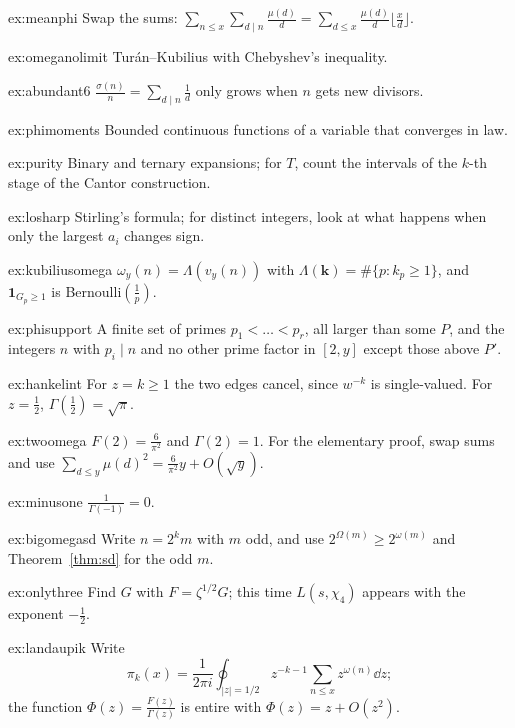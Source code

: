 \begin{hint}{ex:meanphi}
Swap the sums: $\sum_{n\le x}\sum_{d\mid n}\frac{\mu(d)}d=\sum_{d\le x}\frac{\mu(d)}d\lfloor\frac xd\rfloor$.
\end{hint}
\begin{hint}{ex:omeganolimit}
Tur\'an--Kubilius with Chebyshev's inequality.
\end{hint}
\begin{hint}{ex:abundant6}
$\frac{\sigma(n)}n=\sum_{d\mid n}\frac1d$ only grows when $n$ gets new divisors.
\end{hint}
\begin{hint}{ex:phimoments}
Bounded continuous functions of a variable that converges in law.
\end{hint}
\begin{hint}{ex:purity}
Binary and ternary expansions; for $T$, count the intervals of the $k$-th stage of the Cantor construction.
\end{hint}
\begin{hint}{ex:losharp}
Stirling's formula; for distinct integers, look at what happens when only the largest $a_i$ changes sign.
\end{hint}
\begin{hint}{ex:kubiliusomega}
$\omega_y(n)=\Lambda(v_y(n))$ with $\Lambda(\mathbf k)=\#\{p:k_p\ge1\}$, and $\mathbf 1_{G_p\ge1}$ is Bernoulli$(\frac1p)$.
\end{hint}
\begin{hint}{ex:phisupport}
A finite set of primes $p_1<\dots<p_r$, all larger than some $P$, and the integers $n$ with $p_i\mid n$ and no other prime factor in $[2,y]$ except those above $P'$.
\end{hint}

\begin{hint}{ex:hankelint}
For $z=k\ge1$ the two edges cancel, since $w^{-k}$ is single-valued. For $z=\frac12$, $\Gamma(\frac12)=\sqrt\pi$.
\end{hint}
\begin{hint}{ex:twoomega}
$F(2)=\frac6{\pi^2}$ and $\Gamma(2)=1$. For the elementary proof, swap sums and use $\sum_{d\le y}\mu(d)^2=\frac6{\pi^2}y+O(\sqrt y)$.
\end{hint}
\begin{hint}{ex:minusone}
$\frac1{\Gamma(-1)}=0$.
\end{hint}
\begin{hint}{ex:bigomegasd}
Write $n=2^km$ with $m$ odd, and use $2^{\Omega(m)}\ge2^{\omega(m)}$ and Theorem~\ref{thm:sd} for the odd $m$.
\end{hint}
\begin{hint}{ex:onlythree}
Find $G$ with $F=\zeta^{1/2}G$; this time $L(s,\chi_4)$ appears with the exponent $-\frac12$.
\end{hint}
\begin{hint}{ex:landaupik}
Write
\[
\pi_k(x)=\frac1{2\pi i}\oint_{|z|=1/2}z^{-k-1}\sum_{n\le x}z^{\omega(n)}\dd z;
\]
the function $\Phi(z)=\frac{F(z)}{\Gamma(z)}$ is entire with $\Phi(z)=z+O(z^2)$.
\end{hint}


